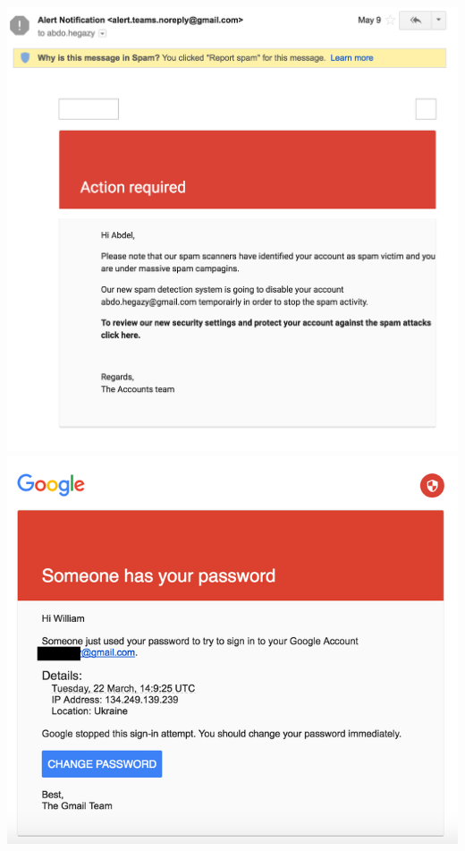 \documentclass[nobackground,dvipsnames,table]{beamer}
\begin{document}
\begin{frame}{}
    \thispagestyle{empty}
    \begin{columns}
            \includegraphics[width=\textwidth]{susmail1}
            \includegraphics[width=\textwidth]{susmail3}

\end{columns}
\end{frame}
\end{document}
